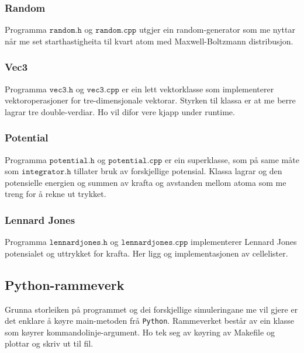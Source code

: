 \documentclass[12pt, a4paper]{article}
\theoremstyle{definition} \newtheorem*{definition}{Teorem}
\begin{document}
        \subsubsection*{Random}
            Programma $\texttt{random.h}$ og $\texttt{random.cpp}$ utgjer ein random-generator som me nyttar når me set starthastigheita til kvart atom med 
            Maxwell-Boltzmann distribusjon.

        \subsubsection*{Vec3}
            Programma $\texttt{vec3.h}$ og $\texttt{vec3.cpp}$ er ein lett vektorklasse som implementerer vektoroperasjoner for tre-dimensjonale vektorar. Styrken til klassa 
            er at me berre lagrar tre double-verdiar. Ho vil difor vere kjapp under runtime.

        \subsubsection*{Potential}
            Programma $\texttt{potential.h}$ og $\texttt{potential.cpp}$ er ein superklasse, som på same måte som $\texttt{integrator.h}$ tillater bruk av forskjellige
            potensial. Klassa lagrar og den potensielle energien og summen av krafta og avstanden mellom atoma som me treng for å rekne ut trykket.

        \subsubsection*{Lennard Jones}
            Programma $\texttt{lennardjones.h}$ og $\texttt{lennardjones.cpp}$ implementerer Lennard Jones potensialet og uttrykket for krafta. Her ligg og implementasjonen 
            av cellelister.


    \subsection*{Python-rammeverk}
        Grunna storleiken på programmet og dei forskjellige simuleringane me vil gjere er det enklare å køyre main-metoden frå \verb!Python!. Rammeverket består av ein klasse
        som køyrer kommandolinje-argument. Ho tek seg av køyring av Makefile og plottar og skriv ut til fil.
\newpage
\end{document}
